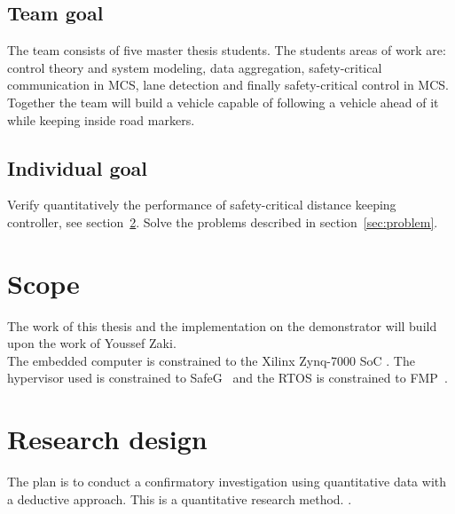 \subsection{Team goal}
The team consists of five master thesis students. The students areas of work are: control theory and system modeling, data aggregation, safety-critical communication in MCS, lane detection and finally safety-critical control in MCS. Together the team will build a vehicle capable of following a vehicle ahead of it while keeping inside road markers.

\subsection{Individual goal}
Verify quantitatively the performance of safety-critical distance keeping controller, see section~\ref{sec:research}. Solve the problems described in section~\ref{sec:problem}.

\section{Scope}
\label{sec:scope}
The work of this thesis and the implementation on the demonstrator will build upon the work of Youssef Zaki\cite{zaki2016}.\\

The embedded computer is constrained to the Xilinx Zynq-7000 SoC \cite{website:xilinx}. The hypervisor used is constrained to SafeG~\cite{website:safeg} and the RTOS is constrained to FMP~\cite{website:fmp}. 



\section{Research design}
\label{sec:research}
The plan is to conduct a confirmatory investigation using quantitative data with a deductive approach. This is a quantitative research method. \cite{hakansson2013}.\\ %

